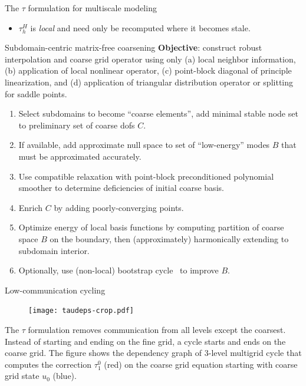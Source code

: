 \documentclass[final,t]{beamer}
\begin{document}
\begin{frame}{}
\begin{columns}
\begin{column}{0.31\textwidth}
\begin{block}{The $\tau$ formulation for multiscale modeling}
\begin{itemize}
        \item $\tau_h^H$ is \emph{local} and need only be recomputed where it becomes stale.
        \end{itemize}
      \end{block}
      \vspace{-2.4em}
      \begin{block}{Subdomain-centric matrix-free coarsening}
        {\bf Objective}: construct robust interpolation and coarse grid operator using only (a) local neighbor information, (b) application of local nonlinear operator, (c) point-block diagonal of principle linearization, and (d) application of triangular distribution operator or splitting~\cite{bkmms2012} for saddle points.
        \begin{enumerate}
        \item Select subdomains to become ``coarse elements'', add minimal stable node set to preliminary set of coarse dofs $C$.
        \item If available, add approximate null space to set of ``low-energy'' modes $B$ that must be approximated accurately.
        \item Use compatible relaxation with point-block preconditioned polynomial smoother to determine deficiencies of initial coarse basis.
        \item Enrich $C$ by adding poorly-converging points.
        \item Optimize energy of local basis functions by computing partition of coarse space $B$ on the boundary, then (approximately) harmonically extending to subdomain interior.
        \item Optionally, use (non-local) bootstrap cycle~\cite{brandt2011bootstrap} to improve $B$.
        \end{enumerate}
      \end{block}
      \vspace{-2.4em}
      \begin{block}{Low-communication cycling}
            \begin{figure}
              \texttt{[image: taudeps-crop.pdf]}
            \end{figure}
            The $\tau$ formulation removes communication from all levels except the coarsest.
            Instead of starting and ending on the fine grid, a cycle starts and ends on the coarse grid.
            The figure shows the dependency graph of 3-level multigrid cycle that computes the correction $\tau_1^0$ (red) on the coarse grid equation starting with coarse grid state $u_0$ (blue).

\end{block}
\end{column}
\end{columns}
\end{frame}
\end{document}
